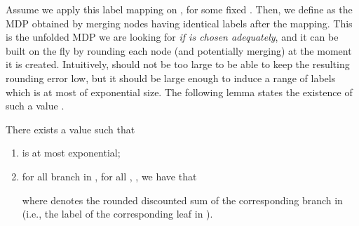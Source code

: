 \documentclass{llncs}
\begin{document}
Assume we apply this label mapping on , for some fixed . Then, we define  as the MDP obtained by merging nodes having identical labels after the mapping. This is the unfolded MDP we are looking for \textit{if  is chosen adequately}, and it can be built on the fly by rounding each node (and potentially merging) at the moment it is created. Intuitively,  should not be too large to be able to keep the resulting rounding error low, but it should be large enough to induce a range of labels which is at most of exponential size. The following lemma states the existence of such a value .

\begin{lemma}
\label{lem:ds_rounding}
There exists a value  such that
\begin{enumerate}
\item  is at most exponential;
\item for all branch  in , for all , , we have that

where  denotes the rounded discounted sum of the corresponding branch  in  (i.e., the label of the corresponding leaf in ).
\end{enumerate}
\end{lemma} 
\end{document}

